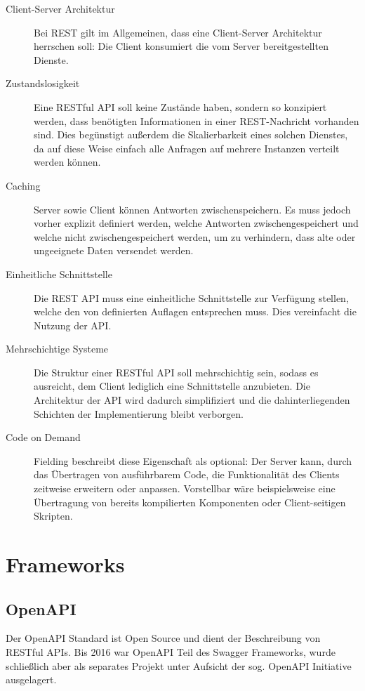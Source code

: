 		\begin{description}
			\item[Client-Server Architektur] 
				Bei REST gilt im Allgemeinen, dass eine Client-Server Architektur herrschen soll: Die Client konsumiert die vom Server bereitgestellten Dienste. 
			\item[Zustandslosigkeit] 
				Eine RESTful API soll keine Zustände haben, sondern so konzipiert werden, dass benötigten Informationen in einer REST-Nachricht vorhanden sind. Dies begünstigt außerdem die Skalierbarkeit eines solchen Dienstes, da auf diese Weise einfach alle Anfragen auf mehrere Instanzen verteilt werden können.
			\item[Caching] 
				Server sowie Client können Antworten zwischenspeichern. Es muss jedoch vorher explizit definiert werden, welche Antworten zwischengespeichert und welche nicht zwischengespeichert werden, um zu verhindern, dass alte oder ungeeignete Daten versendet werden.
			\item[Einheitliche Schnittstelle]
				Die REST API muss eine einheitliche Schnittstelle zur Verfügung stellen, welche den von \cite{RoyThomasFielding.2000} definierten Auflagen entsprechen muss. Dies vereinfacht die Nutzung der API.
			\item[Mehrschichtige Systeme]
				 Die Struktur einer RESTful API soll mehrschichtig sein, sodass es ausreicht, dem Client lediglich eine Schnittstelle anzubieten. Die Architektur der API wird dadurch simplifiziert und die dahinterliegenden Schichten der Implementierung bleibt verborgen.
			\item[Code on Demand] 
				Fielding beschreibt diese Eigenschaft als optional: Der Server kann, durch das Übertragen von ausführbarem Code, die Funktionalität des Clients zeitweise erweitern oder anpassen. Vorstellbar wäre beispielsweise eine Übertragung von bereits kompilierten Komponenten oder Client-seitigen Skripten. 
				
		\end{description}

	\section{Frameworks}
	
		\subsection{OpenAPI} %
		
			Der OpenAPI Standard ist Open Source und dient der Beschreibung von RESTful APIs. Bis 2016 war OpenAPI Teil des Swagger Frameworks, wurde schließlich aber als separates Projekt unter Aufsicht der sog. OpenAPI Initiative ausgelagert. 
			
